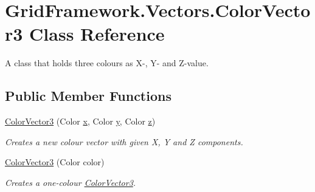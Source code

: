 \hypertarget{class_grid_framework_1_1_vectors_1_1_color_vector3}{\section{Grid\+Framework.\+Vectors.\+Color\+Vector3 Class Reference}
\label{class_grid_framework_1_1_vectors_1_1_color_vector3}
}


A class that holds three colours as X-\/, Y-\/ and Z-\/value. 


\subsection*{Public Member Functions}
\begin{DoxyCompactItemize}
\item 
\hyperlink{class_grid_framework_1_1_vectors_1_1_color_vector3_a3f63bfe624852dd1cc363da3eb4e5fae_a3f63bfe624852dd1cc363da3eb4e5fae}{Color\+Vector3} (Color \hyperlink{class_grid_framework_1_1_vectors_1_1_color_vector3_a5ea343a66fb2f8f1dc3294761f9a9506_a5ea343a66fb2f8f1dc3294761f9a9506}{x}, Color \hyperlink{class_grid_framework_1_1_vectors_1_1_color_vector3_a10438170f7d6aa99e0a0bef67edd1339_a10438170f7d6aa99e0a0bef67edd1339}{y}, Color \hyperlink{class_grid_framework_1_1_vectors_1_1_color_vector3_ad2a62e1eb83e3ef54e03c99018b0926a_ad2a62e1eb83e3ef54e03c99018b0926a}{z})
\begin{DoxyCompactList}\small\item\em Creates a new colour vector with given X, Y and Z components.\end{DoxyCompactList}\item 
\hyperlink{class_grid_framework_1_1_vectors_1_1_color_vector3_ad28e9adaca7bc239c3e791f6ab3206b3_ad28e9adaca7bc239c3e791f6ab3206b3}{Color\+Vector3} (Color color)
\begin{DoxyCompactList}\small\item\em Creates a one-\/colour \hyperlink{class_grid_framework_1_1_vectors_1_1_color_vector3}{Color\+Vector3}.\end{DoxyCompactList}\end{DoxyCompactItemize}
